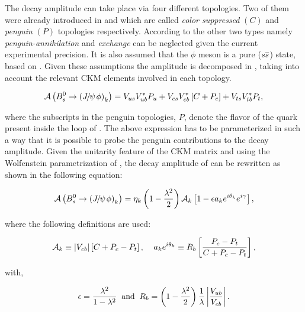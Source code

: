 The \BsJpsiPhi decay amplitude can take place via four different topologies.
Two of them were already introduced in  and  which are called {\it color suppressed }$(C)$ and {\it penguin} $(P)$
topologies respectively. According to \cite{DeBruyn-thesis} the other two types namely {\it penguin-annihilation} and {\it exchange} can be neglected
given the current experimental precision. It is also assumed that the $\phi$ meson is a pure ($s\overline {s}$) state, based on \cite{Faller:2008gt}.
Given these assumptions the \BsJpsiPhi amplitude is decomposed in , taking into account the relevant CKM elements involved in each topology.

\begin{equation}
\mathcal{A} \left( B^0_s\rightarrow \left({J\mskip -3mu/\mskip -2mu\psi\mskip 2mu} \phi\right)_{k} \right) = V_{us}V_{ub}^*P_{u} + V_{cs}V_{cb}^*\left[ C +P_{c} \right] + V_{ts}V_{tb}^*P_{t},
 \label{bsjpsiphi_amp}
\end{equation}

\noindent where the subscripts in the penguin topologies, $P$, denote the flavor of the quark present inside the loop of .
The above expression has to be parameterized in such a way that it is possible to probe the penguin contributions to
the \BsJpsiPhi decay amplitude. Given the unitarity feature of the CKM matrix and using the Wolfenstein parametrization
of , the decay amplitude of  can be rewritten as shown in the following equation:

\begin{equation}
  \mathcal{A} \left( B^0_s\rightarrow \left({J\mskip -3mu/\mskip -2mu\psi\mskip 2mu} \phi\right)_{k} \right) = \eta_k  \left( 1-\frac{\lambda^2}{2} \right) \mathcal{A}_{k} \left[  1 - \epsilon a_k e^{i\theta_k} e^{i\gamma}  \right],
 \label{bsjpsiphi_amp_param}
\end{equation}

\noindent where the following definitions are used:

\begin{equation}
  \mathcal{A}_{k} \equiv |V_{cb}| \left[ C + P_c - P_t \right], \;\;\;\; a_k e^{i\theta_k} \equiv R_b \left[  \frac{P_c - P_t}{C + P_c - P_t}  \right],
  \label{bsjpsiphi_amp_param_defs}
\end{equation}

\noindent with,

\begin{equation}
  \epsilon = \frac{\lambda^2}{1-\lambda^2} \;\;\text{and} \;\;  R_b = \left( 1-\frac{\lambda^2}{2} \right) \frac{1}{\lambda} \left| \frac{V_{ub}}{V_{cb}} \right|.
  \label{bsjpsiphi_amp_param_defs_II}
\end{equation}

